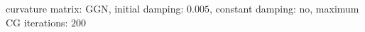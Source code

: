 curvature matrix: $\text{GGN}$, initial damping: $\num[scientific-notation=true]{0.005}$, constant damping: $\text{no}$, maximum CG iterations: $\num[scientific-notation=false]{200}$